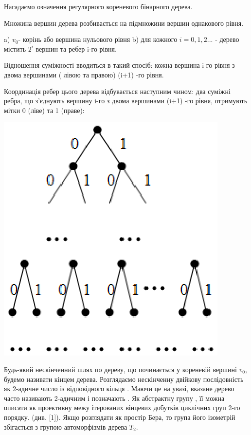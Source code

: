 \documentclass[a4paper,12pt]{article} \usepackage{a4wide}
\numberwithin{equation}{subsection}
\begin{document}
Нагадаємо означення регулярного кореневого бінарного дерева.

Множина вершин дерева розбивається на підмножини вершин однакового рівня.

a)  $v_0$- корінь або вершина нульового рівня
b) для кожного $i=0,1,2...$ - дерево містить  $2^i$  вершин та ребер  i-го рівня.

Відношення суміжності вводиться в такий спосіб: кожна вершина   i-го рівня з
 двома вершинами ( лівою та правою) (i+1) -го рівня.

Координація ребер цього дерева відбувається наступним чином: два суміжні ребра, що з'єднують вершину   i-го з двома вершинами (i+1) -го рівня, отримують мітки 0 (ліве) та 1 (праве):

\begin{center}
\includegraphics[scale=1.3]{koord.eps}
\end{center}



Будь-який нескінченний шлях по дереву, що починається у кореневій вершині $v_0$, будемо називати кінцем дерева.
Розглядаємо нескінченну двійкову послідовність як 2-адичне число із відповідного кільця  . Маючи це на увазі, вказане дерево часто називають 2-адичним і позначають  .
 Як абстрактну групу  , її можна описати як проективну межу    ітерованих вінцевих добутків циклічних груп 2-го порядку. (див. [1]).
Якщо   розглядати як простір Бера, то група його ізометрій збігається з групою автоморфізмів дерева $T_2$.
\end{document}
